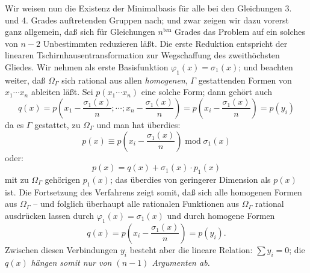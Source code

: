 Wir weisen nun die Existenz der Minimalbasis für alle bei den Gleichungen 3. und 4. Grades auftretenden Gruppen nach; und zwar zeigen wir dazu vorerst ganz allgemein, daß sich für Gleichungen $n^{\text{ten}}$ Grades das Problem auf ein solches von $n-2$ Unbestimmten reduzieren läßt. Die erste Reduktion entspricht der linearen Tschirnhausentransformation zur Wegschaffung des zweithöchsten Gliedes. Wir nehmen als erste Basisfunktion $\varphi_1(x)=\sigma_1(x)$; und beachten weiter, daß $\Omega_\Gamma$ sich rational aus allen \emph{homogenen}, $\Gamma$ gestattenden Formen von $x_1\cdots x_n$ ableiten läßt. Sei $p(x_1\cdots x_n)$ eine solche Form; dann gehört auch
\[
q(x)=p\left(x_1-\frac{\sigma_1(x)}{n};\cdots;x_n-\frac{\sigma_1(x)}{n}\right)=p\left(x_i-\frac{\sigma_1(x)}{n}\right)=p(y_i)
\]
da es $\Gamma$ gestattet, zu $\Omega_\Gamma$ und man hat überdies:
\[
p(x)\equiv p\left(x_i-\frac{\sigma_1(x)}{n}\right)\operatorname{mod}\sigma_1(x)
\]
oder:
\[
p(x)=q(x)+\sigma_1(x)\cdot p_1(x)
\]
mit zu $\Omega_\Gamma$ gehörigen $p_1(x)$; das überdies von geringerer Dimension als $p(x)$ ist. Die Fortsetzung des Verfahrens zeigt somit, daß sich alle homogenen Formen aus $\Omega_\Gamma$ -- und folglich überhaupt alle rationalen Funktionen aus $\Omega_\Gamma$ rational ausdrücken lassen durch $\varphi_1(x)=\sigma_1(x)$ und durch homogene Formen
\[
q(x)=p\left(x_i-\frac{\sigma_1(x)}{n}\right)=p(y_i).
\]
Zwischen diesen Verbindungen $y_i$ besteht aber die lineare Relation: $\sum y_i=0$; die $q(x)$ \emph{hängen somit nur von $(n-1)$ Argumenten ab.}

